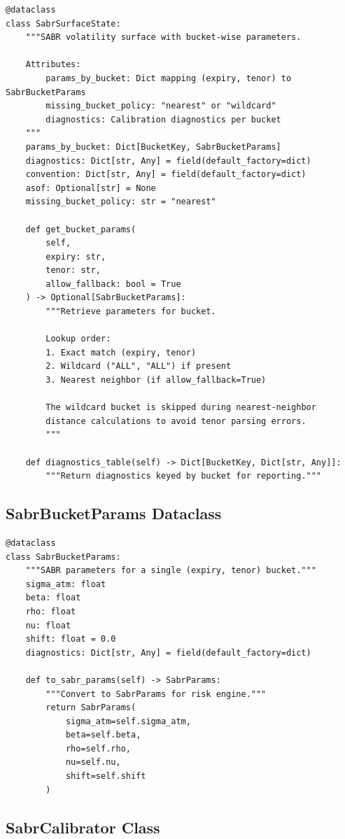 \documentclass[12pt,a4paper]{report}
\begin{document}
\begin{lstlisting}
@dataclass
class SabrSurfaceState:
    """SABR volatility surface with bucket-wise parameters.
    
    Attributes:
        params_by_bucket: Dict mapping (expiry, tenor) to SabrBucketParams
        missing_bucket_policy: "nearest" or "wildcard"
        diagnostics: Calibration diagnostics per bucket
    """
    params_by_bucket: Dict[BucketKey, SabrBucketParams]
    diagnostics: Dict[str, Any] = field(default_factory=dict)
    convention: Dict[str, Any] = field(default_factory=dict)
    asof: Optional[str] = None
    missing_bucket_policy: str = "nearest"
    
    def get_bucket_params(
        self,
        expiry: str,
        tenor: str,
        allow_fallback: bool = True
    ) -> Optional[SabrBucketParams]:
        """Retrieve parameters for bucket.
        
        Lookup order:
        1. Exact match (expiry, tenor)
        2. Wildcard ("ALL", "ALL") if present
        3. Nearest neighbor (if allow_fallback=True)
        
        The wildcard bucket is skipped during nearest-neighbor
        distance calculations to avoid tenor parsing errors.
        """
    
    def diagnostics_table(self) -> Dict[BucketKey, Dict[str, Any]]:
        """Return diagnostics keyed by bucket for reporting."""
\end{lstlisting}

\subsection{SabrBucketParams Dataclass}

\begin{lstlisting}
@dataclass
class SabrBucketParams:
    """SABR parameters for a single (expiry, tenor) bucket."""
    sigma_atm: float
    beta: float
    rho: float
    nu: float
    shift: float = 0.0
    diagnostics: Dict[str, Any] = field(default_factory=dict)
    
    def to_sabr_params(self) -> SabrParams:
        """Convert to SabrParams for risk engine."""
        return SabrParams(
            sigma_atm=self.sigma_atm,
            beta=self.beta,
            rho=self.rho,
            nu=self.nu,
            shift=self.shift
        )
\end{lstlisting}

\subsection{SabrCalibrator Class}
\end{document}
